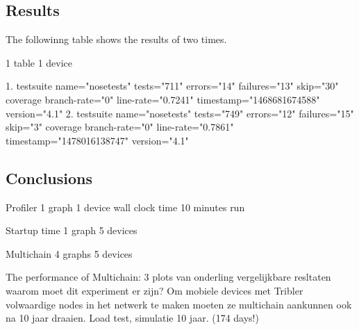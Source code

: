 \subsection{Results}
The followinng table shows the results of two times.

1 table
1 device

1.
testsuite name="nosetests" tests="711" errors="14" failures="13" skip="30"
coverage branch-rate="0" line-rate="0.7241" timestamp="1468681674588" version="4.1"
2.
testsuite name="nosetests" tests="749" errors="12" failures="15" skip="3"
coverage branch-rate="0" line-rate="0.7861" timestamp="1478016138747" version="4.1"

\subsection{Conclusions}







Profiler
1 graph
1 device
wall clock time
10 minutes run


Startup time
1 graph
5 devices


Multichain
4 graphs
5 devices

The performance of Multichain:
3 plots van onderling vergelijkbare resltaten
waarom moet dit experiment er zijn?
Om mobiele devices met Tribler volwaardige nodes in het netwerk te maken moeten ze multichain aankunnen ook na 10 jaar draaien.
Load test, simulatie 10 jaar. (174 days!)
